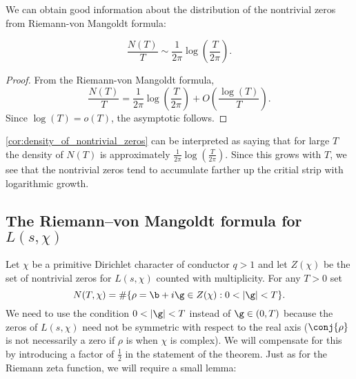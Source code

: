       We can obtain good information about the distribution of the nontrivial zeros from Riemann-von Mangoldt formula:

      \begin{corollary}\label{cor:density_of_nontrivial_zeros}
        \phantom{ }
        \[
          \frac{N(T)}{T} \sim \frac{1}{2\pi}\log\left(\frac{T}{2\pi}\right).
        \]
      \end{corollary}
      \begin{proof}
        From the Riemann-von Mangoldt formula,
        \[
          \frac{N(T)}{T} = \frac{1}{2\pi}\log\left(\frac{T}{2\pi}\right)+O\left(\frac{\log(T)}{T}\right).
        \]
        Since $\log(T) = o(T)$, the asymptotic follows.
      \end{proof}

      \cref{cor:density_of_nontrivial_zeros} can be interpreted as saying that for large $T$ the density of $N(T)$ is approximately $\frac{1}{2\pi}\log\left(\frac{T}{2\pi}\right)$. Since this grows with $T$, we see that the nontrivial zeros tend to accumulate farther up the critial strip with logarithmic growth.
    \subsection*{The Riemann–von Mangoldt formula for $L(s,\chi)$}
      Let $\chi$ be a primitive Dirichlet character of conductor $q > 1$ and let $Z(\chi)$ be the set of nontrivial zeros for $L(s,\chi)$ counted with multiplicity. For any $T > 0$ set
      \[
        N(T,\chi) = \#\{\rho = \b+i\g \in Z(\chi):0 < |\g| < T\}.
      \]
      We need to use the condition $0 < |\g| < T$ instead of $\g \in (0,T)$ because the zeros of $L(s,\chi)$ need not be symmetric with respect to the real axis ($\conj{\rho}$ is not necessarily a zero if $\rho$ is when $\chi$ is complex). We will compensate for this by introducing a factor of $\frac{1}{2}$ in the statement of the theorem. Just as for the Riemann zeta function, we will require a small lemma:

